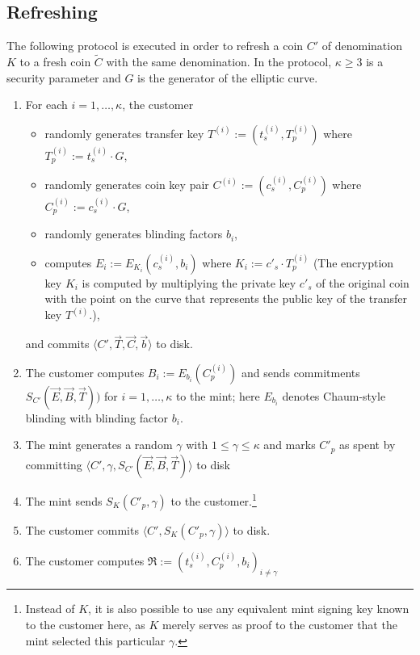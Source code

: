 \documentclass{llncs}
\begin{document}
\subsection{Refreshing}

The following protocol is executed in order to refresh a coin $C'$ of denomination $K$ to
a fresh coin $\widetilde{C}$ with the same denomination. In the protocol, $\kappa \ge 3$ is a security parameter and $G$ is the generator of the elliptic curve.

\begin{enumerate}
  \item For each $i = 1,\ldots,\kappa$, the customer
    \begin{itemize}
      \item randomly generates transfer key $T^{(i)} := \left(t^{(i)}_s,T^{(i)}_p\right)$ where $T^{(i)}_p := t^{(i)}_s \cdot G$,
      \item randomly generates coin key pair $C^{(i)} := \left(c_s^{(i)}, C_p^{(i)}\right)$ where $C^{(i)}_p := c^{(i)}_s \cdot G$,
      \item randomly generates blinding factors $b_i$,
      \item computes $E_i := E_{K_i}\left(c_s^{(i)}, b_i\right)$ where $K_i := c'_s \cdot T_p^{(i)}$ (The encryption key $K_i$ is
            computed by multiplying the private key $c'_s$ of the original coin with the point on the curve
            that represents the public key of the transfer key $T^{(i)}$.),
    \end{itemize}
    and commits $\langle C', \vec{T}, \vec{C}, \vec{b} \rangle$ to disk.
  \item The customer computes $B_i := E_{b_i}(C^{(i)}_p)$ and sends commitments
    $S_{C'}(\vec{E}, \vec{B}, \vec{T}))$ for $i=1,\ldots,\kappa$ to the mint;
    here $E_{b_i}$ denotes Chaum-style blinding with blinding factor $b_i$.
  \item The mint generates a random $\gamma$ with $1 \le \gamma \le \kappa$ and
    marks $C'_p$ as spent by committing
    $\langle C', \gamma, S_{C'}(\vec{E}, \vec{B}, \vec{T}) \rangle$ to disk
  \item The mint sends $S_K(C'_p, \gamma)$ to the customer.\footnote{Instead of $K$, it is also
    possible to use any equivalent mint signing key known to the customer here, as $K$ merely
    serves as proof to the customer that the mint selected this particular $\gamma$.}
  \item The customer commits $\langle C', S_K(C'_p, \gamma) \rangle$ to disk.
  \item The customer computes $\mathfrak{R} := \left(t_s^{(i)}, C_p^{(i)}, b_i\right)_{i \ne \gamma}$

\end{enumerate}
\end{document}
